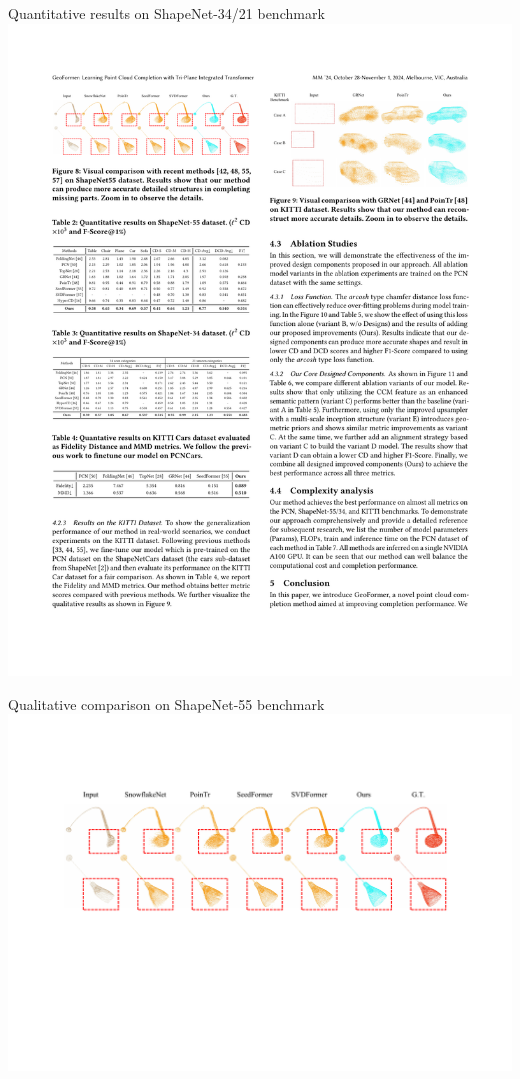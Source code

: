 \documentclass[landscape,a0paper,fontscale=0.292]{baposter}
\begin{document}
\begin{poster}
{\begin{minipage}[t]{0.49\textwidth}
        \begin{center}
            Quantitative results on ShapeNet-34/21 benchmark \\
            \includegraphics[width=\textwidth]{images/table-SP34.pdf}
        \end{center}
        \vspace{-1.8em}
        \begin{center}
            Qualitative comparison on ShapeNet-55 benchmark \\[0.2em]
            \includegraphics[width=\textwidth]{images/result-shapenet55.pdf}
        \end{center}
        \vspace{-1.3em}


\end{minipage}}
\end{poster}
\end{document}

